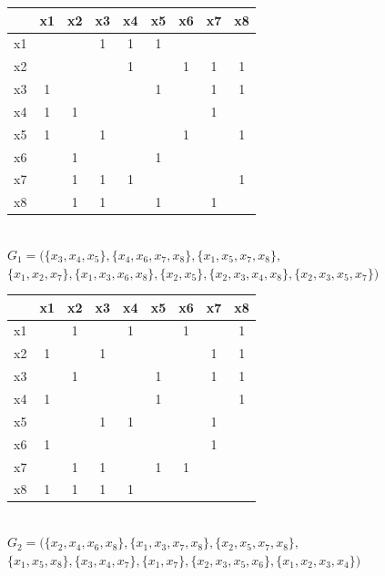 \documentclass[12pt]{article}
\begin{document}
\begin{enumerate}
\begin{center}
\begin{tabular}{|c|c|c|c|c|c|c|c|c|}
\hline
 & x1 & x2 & x3 & x4 & x5 & x6 & x7 & x8 \\ \hline
x1 &  &  & 1 & 1 & 1 &  &  &  \\ \hline
x2 &  &  &  & 1 &  & 1 & 1 & 1 \\ \hline
x3 & 1 &  &  &  & 1 &  & 1 & 1 \\ \hline
x4 & 1 & 1 &  &  &  &  & 1 &  \\ \hline
x5 & 1 &  & 1 &  &  & 1 &  & 1 \\ \hline
x6 &  & 1 &  &  & 1 &  &  &  \\ \hline
x7 &  & 1 & 1 & 1 &  &  &  & 1 \\ \hline
x8 &  & 1 & 1 &  & 1 &  & 1 &  \\ \hline
\end{tabular}
\\
     \vspace{0.25cm}
     $G_1 = (\{x_3, x_4, x_5 \}, \{x_4, x_6, x_7, x_8\}, \{x_1, x_5, x_7, x_8 \},$\\ $\{x_1, x_2, x_7\}, \{x_1, x_3, x_6, x_8\}, \{x_2, x_5 \}, \{x_2, x_3, x_4, x_8 \}, \{x_2, x_3, x_5, x_7 \})$\\
     \vspace{0.5cm}
     
     
\begin{tabular}{|c|c|c|c|c|c|c|c|c|}
\hline
 & x1 & x2 & x3 & x4 & x5 & x6 & x7 & x8 \\ \hline
x1 &  & 1 &  & 1 &  & 1 &  & 1 \\ \hline
x2 & 1 &  & 1 &  &  &  & 1 & 1 \\ \hline
x3 &  & 1 &  &  & 1 &  & 1 & 1 \\ \hline
x4 & 1 &  &  &  & 1 &  &  & 1 \\ \hline
x5 &  &  & 1 & 1 &  &  & 1 &  \\ \hline
x6 & 1 &  &  &  &  &  & 1 &  \\ \hline
x7 &  & 1 & 1 &  & 1 & 1 &  &  \\ \hline
x8 & 1 & 1 & 1 & 1 &  &  &  &  \\ \hline
\end{tabular}
\\
     \vspace{0.25cm}
     $G_2 = (\{x_2, x_4, x_6, x_8\}, \{x_1, x_3, x_7, x_8\}, \{x_2, x_5, x_7, x_8 \},$\\ $\{x_1, x_5, x_8\}, \{x_3, x_4, x_7\}, \{x_1, x_7\}, \{x_2, x_3, x_5, x_6 \}, \{x_1, x_2, x_3, x_4 \})$\\
     \vspace{0.5cm}
     

\end{center}
\end{enumerate}
\end{document}
